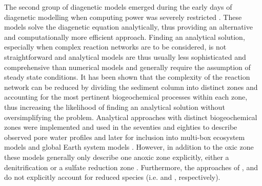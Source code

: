 \documentclass[gmd, manuscript]{copernicus}
\begin{document}
The second group of diagenetic models emerged during the early days of diagenetic modelling when computing power was severely restricted \citep[e.g.][]{berner_idealized_1964}. 
These models solve the diagenetic equation analytically, thus providing an alternative and computationally more efficient approach. Finding an analytical solution, especially when complex reaction networks are to be considered, 
is not straightforward and analytical models are thus usually less sophisticated and comprehensive than numerical models and generally require the assumption of steady state conditions. 
It has been shown that the complexity of the reaction network can be reduced by dividing the sediment column into distinct zones and accounting for the most pertinent biogeochemical processes within each zone, thus increasing the likelihood 
of finding an analytical solution without oversimplifying the problem. %
Analytical approaches with distinct biogeochemical zones were implemented and used in the seventies and eighties to describe observed pore water profiles 
\citep[e.g.][]{vanderborght_vertical_1975, vanderborght_kinetic_1977, billen1982idealized, goloway_diagenetic_1982, boudreau_dependence_1984} 
and later for inclusion into multi-box ecosystem models \citep[e.g.][]{ruardij_benthic_1995, gypens_simple_2008} %
and global Earth system models \citep{tromp_global_1995}. 
However, in addition to the oxic zone these models generally only describe one anoxic zone explicitly, either a denitrification \citep{vanderborght_vertical_1975, billen1982idealized, goloway_diagenetic_1982, ruardij_benthic_1995, gypens_simple_2008} 
or a sulfate reduction zone \citep{boudreau_dependence_1984, tromp_global_1995}. Furthermore, the approaches of \citet{vanderborght_vertical_1975}, \citet{goloway_diagenetic_1982} and \citet{tromp_global_1995} do not explicitly account for reduced 
species (i.e.  and , respectively). 

\end{document}

